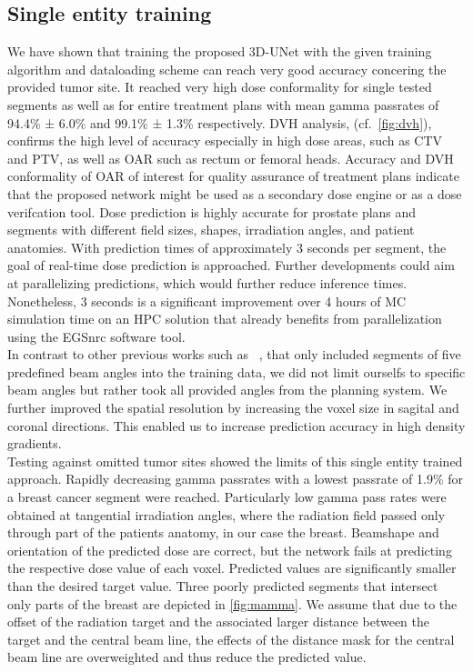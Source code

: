 \subsection{Single entity training}\label{ssec:SET}

We have shown that training the proposed 3D-UNet with the given training algorithm and dataloading scheme can reach very good accuracy concering the provided tumor site. 
It reached very high dose conformality for single tested segments as well as for entire treatment plans with mean gamma passrates of 94.4\% ± 6.0\% and 99.1\% ± 1.3\% respectively. 
DVH analysis, (cf.~\autoref{fig:dvh}), confirms the high level of accuracy especially in high dose areas, such as CTV and PTV, as well as \acs{OAR} such as rectum or femoral heads.
Accuracy and DVH conformality of \acs{OAR} of interest for quality assurance of treatment plans indicate that the proposed network might be used as a secondary dose engine or as a dose verifcation tool.
Dose prediction is highly accurate for prostate plans and segments with different field sizes, shapes, irradiation angles, and patient anatomies.
With prediction times of approximately 3 seconds per segment, the goal of real-time dose prediction is approached. 
Further developments could aim at parallelizing predictions, which would further reduce inference times. 
Nonetheless, 3 seconds is a significant improvement over 4 hours of \acs{MC} simulation time on an \acs{HPC} solution that already benefits from parallelization using the EGSnrc software tool.\\
In contrast to other previous works such as \citeauthor{kontaxis_deepdose_2020}~\cite{kontaxis_deepdose_2020}, that only included segments of five predefined beam angles into the training data, we did not limit ourselfs to specific beam angles but rather took all provided angles from the planning system.
We further improved the spatial resolution by increasing the voxel size in sagital and coronal directions.
This enabled us to increase prediction accuracy in high density gradients.\\
Testing against omitted tumor sites showed the limits of this single entity trained approach. 
Rapidly decreasing gamma passrates with a lowest passrate of 1.9\% for a breast cancer segment were reached. 
Particularly low gamma pass rates were obtained at tangential irradiation angles, where the radiation field passed only through part of the patients anatomy, in our case the breast.
Beamshape and orientation of the predicted dose are correct, but the network fails at predicting the respective dose value of each voxel.
Predicted values are significantly smaller than the desired target value.  
Three poorly predicted segments that intersect only parts of the breast are depicted in \autoref{fig:mamma}.
We assume that due to the offset of the radiation target and the associated larger distance between the target and the central beam line, the effects of the distance mask for the central beam line are overweighted and thus reduce the predicted value.\\

